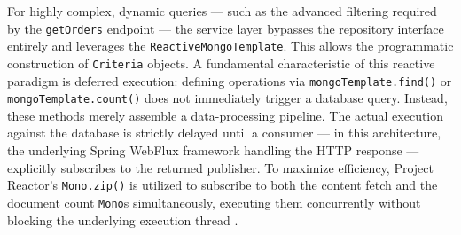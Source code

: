 For highly complex, dynamic queries — such as the advanced filtering required by the \texttt{getOrders} endpoint — the service layer bypasses the repository interface entirely and leverages the \texttt{ReactiveMongoTemplate}. This allows the programmatic construction of \texttt{Criteria} objects. A fundamental characteristic of this reactive paradigm is deferred execution: defining operations via \texttt{mongoTemplate.find()} or \texttt{mongoTemplate.count()} does not immediately trigger a database query. Instead, these methods merely assemble a data-processing pipeline. The actual execution against the database is strictly delayed until a consumer — in this architecture, the underlying Spring WebFlux framework handling the HTTP response — explicitly subscribes to the returned publisher. To maximize efficiency, Project Reactor's \texttt{Mono.zip()} is utilized to subscribe to both the content fetch and the document count \texttt{Mono}s simultaneously, executing them concurrently without blocking the underlying execution thread \cite{project_reactor}.

